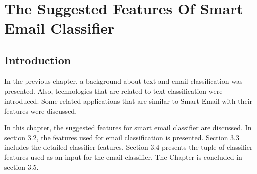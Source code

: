 
\chapter{The Suggested Features Of Smart Email Classifier} %

\label{Chapter3} %



\section{Introduction}
In the previous chapter, a background about text and email classification was 
presented. Also, technologies that are related to text classification were 
introduced. Some related applications that are similar to Smart Email with their 
features were discussed.

In this chapter, the suggested features for smart email classifier are discussed.
In section 3.2, the features used for email classification is presented. Section 
3.3 includes the detailed classifier features. Section 3.4 presents the tuple of 
classifier features used as an input for the email classifier. The Chapter is 
concluded in section 3.5.
\newpage
